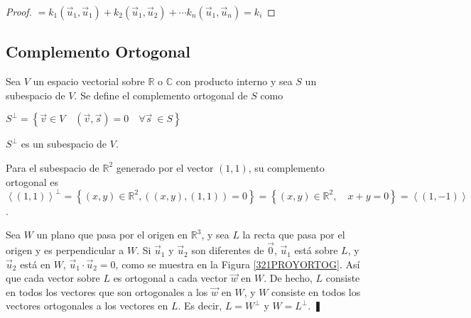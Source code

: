 {\begin{corollary}
\begin{proof}
$=k_1 (\vec{u}_1,\vec{u}_1) +  k_2 (\vec{u}_1,\vec{u}_2) + \cdots  k_n (\vec{u}_1,\vec{u}_n) = k_i$

\end{proof}
\end{corollary}


\bigskip

\subsection{Complemento Ortogonal}

\bigskip


\begin{definition}
    Sea $V$ un espacio vectorial sobre $\mathbb{R}$ o $\mathbb{C}$  con producto interno y sea $S$ un subespacio de $V$. Se define el complemento ortogonal de $S$ como 


\bigskip

$S^{\perp} = \left\{\vec{v}\in V \quad (\vec{v}, \vec{s})=0 \quad \forall \vec{s} ~\in S \right\}$
\end{definition}
\bigskip

\begin{remark}
$S^{\perp}$ es un subespacio de $V$.
\end{remark}  





\begin{example}
Para el subespacio de  $\mathbb{R}^{2}$ generado por el vector $(1,1)$, su complemento ortogonal es  $\left\langle (1,1)\right\rangle^{\perp}=\left\{(x,y) \in \mathbb{R}^{2}, ((x,y),(1,1))=0 \right\}= \left\{(x,y) \in \mathbb{R}^{2}, \quad x+y=0 \right\}=\left\langle (1,-1)\right\rangle$.
\end{example}


\bigskip

\begin{example}
Sea $W$ un plano que pasa por el origen en $\mathbb{R}^3$, y sea $L$ la recta que pasa
por el origen y es perpendicular a $W$. Si $\Vec{u}_1$ y $\Vec{u}_2$ son diferentes de $\Vec{0}$, $\Vec{u}_1$ está sobre $L$, y $\Vec{u}_2$ está en $W$, $\Vec{u}_1 \cdot \Vec{u}_2= 0$, como se muestra en la  Figura \ref{321PROYORTOG}. Así que cada vector sobre $L$ es ortogonal a cada vector $\Vec{w}$ en $W$. De hecho, $L$ consiste en todos los vectores que son ortogonales a los $\Vec{w}$ en
$W$, y $W$ consiste en todos los vectores ortogonales a los vectores  en $L$. Es decir,
$L = W^{\perp}$ y $W = L^{\perp}$. ❚
\end{example} 




}
